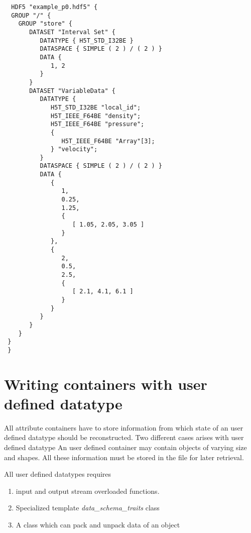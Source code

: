 \begin{verbatim}
  HDF5 "example_p0.hdf5" {
  GROUP "/" {
    GROUP "store" {
       DATASET "Interval Set" {
          DATATYPE { H5T_STD_I32BE }
          DATASPACE { SIMPLE ( 2 ) / ( 2 ) }
          DATA {
             1, 2
          }
       }
       DATASET "VariableData" {
          DATATYPE {
             H5T_STD_I32BE "local_id";
             H5T_IEEE_F64BE "density";
             H5T_IEEE_F64BE "pressure";
             {
                H5T_IEEE_F64BE "Array"[3];
             } "velocity";
          }
          DATASPACE { SIMPLE ( 2 ) / ( 2 ) }
          DATA {
             {
                1,
                0.25,
                1.25,
                {
                   [ 1.05, 2.05, 3.05 ]
                }
             },
             {
                2,
                0.5,
                2.5,
                {
                   [ 2.1, 4.1, 6.1 ]
                }
             }
          }
       }
    }
 }
 }
\end{verbatim}

\section { Writing containers with user defined datatype}
All attribute containers have to store information from which state of an user defined
datatype should be reconstructed. Two different cases arises with user defined datatype
An user defined container may contain objects of varying size and shapes. All these
information must be stored in the file for later retrieval. 

\par All user defined datatypes requires
\begin{enumerate}
\item  input and output stream overloaded functions.
\item  Specialized template {\em data\_schema\_traits} class
\item  A class which can pack and unpack data of an object
\end{enumerate}


